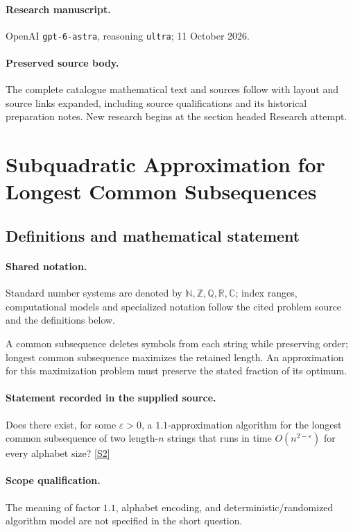 \documentclass[11pt]{article}
\begin{document}
\paragraph{Research manuscript.} OpenAI \texttt{gpt-6-astra}, reasoning \texttt{ultra}; 11 October 2026.
\paragraph{Preserved source body.} The complete catalogue mathematical text and sources follow with layout and source links expanded, including source qualifications and its historical preparation notes. New research begins at the section headed Research attempt.

\section{Subquadratic Approximation for Longest Common Subsequences}\label{statement}

\subsection{Definitions and mathematical statement}

\paragraph{Shared notation.}Standard number systems are denoted by $\mathbb N,\mathbb Z,\mathbb Q,\mathbb R,\mathbb C$; index ranges, computational models and specialized notation follow the cited problem source and the definitions below.


A common subsequence deletes symbols from each string while preserving order; longest common subsequence maximizes the retained length. An approximation for this maximization problem must preserve the stated fraction of its optimum.
\paragraph{Statement recorded in the supplied source.}
Does there exist, for some $\varepsilon>0$, a $1.1$-approximation algorithm for the longest common subsequence of two length-$n$ strings that runs in time $O(n^{2-\varepsilon})$ for every alphabet size? \href{https://doi.org/10.4171/owr/2018/51}{[S2]}
\paragraph{Scope qualification.}
The meaning of factor $1.1$, alphabet encoding, and deterministic/randomized algorithm model are not specified in the short question.
\end{document}
